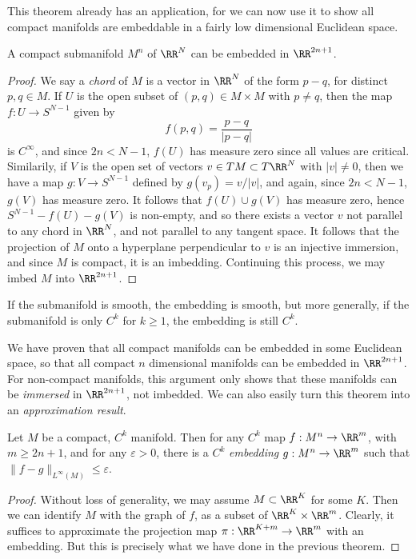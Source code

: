 This theorem already has an application, for we can now use it to show all compact manifolds are embeddable in a fairly low dimensional Euclidean space.

\begin{theorem}
    A compact submanifold $M^n$ of $\RR^N$ can be embedded in $\RR^{2n+1}$.
\end{theorem}
\begin{proof}
    We say a {\it chord} of $M$ is a vector in $\RR^N$ of the form $p - q$, for distinct $p,q \in M$. If $U$ is the open subset of $(p,q) \in M \times M$ with $p \neq q$, then the map $f: U \to S^{N-1}$ given by
    \[ f(p,q) = \frac{p-q}{|p-q|} \]
    is $C^\infty$, and since $2n < N-1$, $f(U)$ has measure zero since all values are critical. Similarily, if $V$ is the open set of vectors $v \in TM \subset T\RR^N$ with $|v| \neq 0$, then we have a map $g: V \to S^{N-1}$ defined by $g(v_p) = v/|v|$, and again, since $2n < N-1$, $g(V)$ has measure zero. It follows that $f(U) \cup g(V)$ has measure zero, hence $S^{N-1} - f(U) - g(V)$ is non-empty, and so there exists a vector $v$ not parallel to any chord in $\RR^N$, and not parallel to any tangent space. It follows that the projection of $M$ onto a hyperplane perpendicular to $v$ is an injective immersion, and since $M$ is compact, it is an imbedding. Continuing this process, we may imbed $M$ into $\RR^{2n+1}$.
\end{proof}

\begin{remark}
    If the submanifold is smooth, the embedding is smooth, but more generally, if the submanifold is only $C^k$ for $k \geq 1$, the embedding is still $C^k$.
\end{remark}

We have proven that all compact manifolds can be embedded in some Euclidean space, so that all compact $n$ dimensional manifolds can be embedded in $\RR^{2n+1}$. For non-compact manifolds, this argument only shows that these manifolds can be {\it immersed} in $\RR^{2n+1}$, not imbedded. We can also easily turn this theorem into an \emph{approximation result}.

\begin{theorem}
    Let $M$ be a compact, $C^k$ manifold. Then for any $C^k$ map $f: M^n \to \RR^m$, with $m \geq 2n + 1$, and for any $\varepsilon > 0$, there is a $C^k$ \emph{embedding} $g: M^n \to \RR^m$ such that $\| f - g \|_{L^\infty(M)} \leq \varepsilon$.
\end{theorem}
\begin{proof}
    Without loss of generality, we may assume $M \subset \RR^K$ for some $K$. Then we can identify $M$ with the graph of $f$, as a subset of $\RR^K \times \RR^m$. Clearly, it suffices to approximate the projection map $\pi: \RR^{K + m} \to \RR^m$ with an embedding. But this is precisely what we have done in the previous theorem.
\end{proof}


